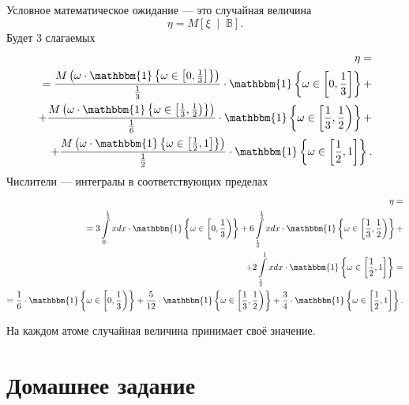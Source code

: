 Условное математическое ожидание ---
это случайная величина
$$ \eta =
  M \left[ \xi \; \middle| \; \mathbb{B} \right].$$
Будет 3 слагаемых
\begin{equation*}
  \begin{split}
    \eta = \\
    = \frac{M \left( \omega \cdot \mathbbm{1} \left\{ \omega \in \left[ 0, \frac{1}{3} \right] \right\} \right) }{ \frac{1}{3}} \cdot
    \mathbbm{1} \left\{ \omega \in \left[ 0, \frac{1}{3} \right] \right\} + \\
    + \frac{M \left( \omega \cdot \mathbbm{1} \left\{ \omega \in \left[ \frac{1}{3}, \frac{1}{2} \right) \right\} \right) }{ \frac{1}{6}} \cdot
    \mathbbm{1} \left\{ \omega \in \left[ \frac{1}{3}, \frac{1}{2} \right) \right\} + \\
    + \frac{M \left( \omega \cdot \mathbbm{1} \left\{ \omega \in \left[ \frac{1}{2}, 1 \right] \right\} \right) }{ \frac{1}{2}} \cdot
    \mathbbm{1} \left\{ \omega \in \left[ \frac{1}{2}, 1 \right] \right\}.
  \end{split}
\end{equation*}
Числители --- интегралы в соответствующих пределах
\begin{equation*}
  \begin{split}
    \eta = \\
    = 3 \int \limits_0^{ \frac{1}{3}} xdx \cdot
    \mathbbm{1} \left\{ \omega \in \left[ 0, \frac{1}{3} \right) \right\} +
    6 \int \limits_{ \frac{1}{3}}^{ \frac{1}{2}} xdx \cdot
    \mathbbm{1} \left\{ \omega \in \left[ \frac{1}{3}, \frac{1}{2} \right) \right\} + \\
    + 2 \int \limits_{ \frac{1}{2}}^1 xdx \cdot
    \mathbbm{1} \left\{ \omega \in \left[ \frac{1}{2}, 1 \right] \right\} = \\
    = \frac{1}{6} \cdot \mathbbm{1} \left\{ \omega \in \left[ 0, \frac{1}{3} \right) \right\} +
    \frac{5}{12} \cdot
    \mathbbm{1} \left\{ \omega \in \left[ \frac{1}{3}, \frac{1}{2} \right) \right\} +
    \frac{3}{4} \cdot \mathbbm{1} \left\{ \omega \in \left[ \frac{1}{2}, 1 \right] \right\}.
  \end{split}
\end{equation*}

На каждом атоме случайная величина принимает своё значение.

\section*{Домашнее задание}
